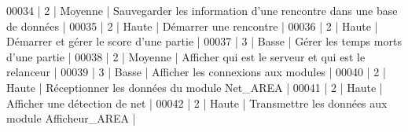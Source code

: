 \begin{DoxyCode}
00034 |     2     |  Moyenne | Sauvegarder les information d'une rencontre dans une base de données |
00035 |     2     |   Haute  | Démarrer une rencontre                                               |
00036 |     2     |   Haute  | Démarrer et gérer le score d'une partie                              |
00037 |     3     |   Basse  | Gérer les temps morts d'une partie                                   |
00038 |     2     |  Moyenne | Afficher qui est le serveur et qui est le relanceur                  |
00039 |     3     |   Basse  | Afficher les connexions aux modules                                  |
00040 |     2     |   Haute  | Réceptionner les données du module Net\_AREA                          |
00041 |     2     |   Haute  | Afficher une détection de net                                        |
00042 |     2     |   Haute  | Transmettre les données aux module Afficheur\_AREA                    |
\end{DoxyCode}
